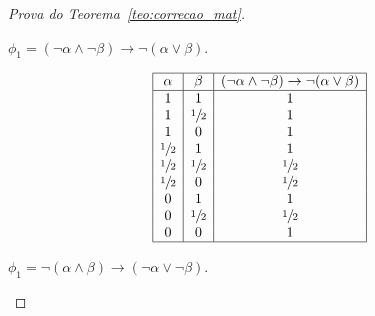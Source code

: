 \begin{proof}[Prova do Teorema~\ref{teo:correcao_mat}]
\begin{provaporcasos}
\begin{provaporsubcasos}
                   

                \subcasodeprova{} $\phi_{1} = (\neg \alpha \land \neg \beta) \to \neg (\alpha \lor \beta)$.

                \begin{center}
                    \[
                        \begin{array}{|c|c|c|}%
                            \hline
                            \alpha      & \beta & (\neg \alpha \land \neg \beta) \to \neg (\alpha \lor \beta) \\
                            \hline%
                            1 & 1 & 1\\
                            1 & \meio{} & 1\\
                            1 & 0 & 1\\
                            \meio{} & 1 & 1\\
                            \meio{} & \meio{} &\meio{}\\ 
                            \meio{} & 0 & \meio{}\\
                            0 & 1 & 1\\
                            0 & \meio{} & \meio{}\\
                            0 & 0 & 1\\
                            \hline
                        \end{array}
                    \]
                \end{center}

                \subcasodeprova{} $\phi_{1} = \neg(\alpha \land \beta) \to (\neg \alpha \lor \neg \beta)$. 


\end{provaporsubcasos}
\end{provaporcasos}
\end{proof}
